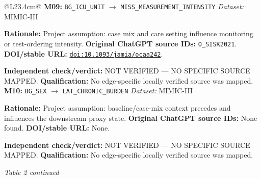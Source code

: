 \begin{tabular}{@{}L{23.4cm}@{}}
\addlinespace[2pt]
\midrule
\textbf{M09:} \nolinkurl{BG_ICU_UNIT} $\rightarrow$ \nolinkurl{MISS_MEASUREMENT_INTENSITY} \hfill \textit{Dataset:} MIMIC-III\par\textbf{Rationale:} Project assumption: case mix and care setting influence monitoring or test-ordering intensity. \textbf{Original ChatGPT source IDs:} \nolinkurl{O_SISK2021}. \textbf{DOI/stable URL:} \href{https://doi.org/10.1093/jamia/ocaa242}{\nolinkurl{doi:10.1093/jamia/ocaa242}}.\par\textbf{Independent check/verdict:} NOT VERIFIED --- NO SPECIFIC SOURCE MAPPED. \textbf{Qualification:} No edge-specific locally verified source was mapped. \\
\addlinespace[2pt]
\midrule
\textbf{M10:} \nolinkurl{BG_SEX} $\rightarrow$ \nolinkurl{LAT_CHRONIC_BURDEN} \hfill \textit{Dataset:} MIMIC-III\par\textbf{Rationale:} Project assumption: baseline/case-mix context precedes and influences the downstream proxy state. \textbf{Original ChatGPT source IDs:} None found. \textbf{DOI/stable URL:} None.\par\textbf{Independent check/verdict:} NOT VERIFIED --- NO SPECIFIC SOURCE MAPPED. \textbf{Qualification:} No edge-specific locally verified source was mapped. \\
\addlinespace[2pt]
\midrule
\bottomrule
\end{tabular}
\clearpage
\textit{Table 2 continued}\par

